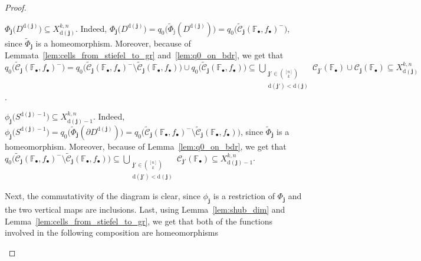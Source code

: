 \begin{proof}
\begin{i_enum}
\item $\Phi_{\mathbf{j}}\big(D^{\mathrm{d}(\mathbf{j})}\big)\subseteq X_{\mathrm{d}(\mathbf{j})}^{k,n}$. Indeed, $\Phi_{\mathbf{j}}\big(D^{\mathrm{d}(\mathbf{j})}\big)=q_0\big(\tilde{\Phi}_{\mathrm{j}}(D^{\mathrm{d}(\mathbf{j})})\big)=q_0\big(\tilde{\mathcal{C}}_{\mathbf{j}}(\mathbb{F}_{\bullet},f_{\bullet})^-\big)$, since $\tilde{\Phi}_{\mathbf{j}}$ is a homeomorphism. Moreover, because of Lemmata~\ref{lem:cells_from_stiefel_to_gr} and~\ref{lem:q0_on_bdr}, we get that $q_0\big(\tilde{\mathcal{C}}_{\mathbf{j}}(\mathbb{F}_{\bullet},f_{\bullet})^-\big)=q_0\big(\tilde{\mathcal{C}}_{\mathbf{j}}(\mathbb{F}_{\bullet},f_{\bullet})^-\setminus\tilde{\mathcal{C}}_{\mathbf{j}}(\mathbb{F}_{\bullet},f_{\bullet})\big)\cup q_0\big(\tilde{\mathcal{C}}_{\mathbf{j}}(\mathbb{F}_{\bullet},f_{\bullet})\big)\subseteq\bigcup_{\substack{\mathbf{j}'\in\binom{[n]}{k}\\\mathrm{d}(\mathbf{j}')<\mathrm{d}(\mathbf{j})}}\mathcal{C}_{\mathbf{j}'}(\mathbb{F}_{\bullet})\cup\mathcal{C}_{\mathbf{j}}(\mathbb{F}_{\bullet})\subseteq X_{\mathrm{d}(\mathbf{j})}^{k,n}$.
\item $\phi_{\mathbf{j}}\big(S^{\mathrm{d}(\mathbf{j})-1}\big)\subseteq X_{\mathrm{d}(\mathbf{j})-1}^{k,n}$. Indeed, $\phi_{\mathbf{j}}\big(S^{\mathrm{d}(\mathbf{j})-1}\big)=q_0\big(\tilde{\Phi}_{\mathbf{j}}(\partial D^{\mathrm{d}(\mathbf{j})})\big)=q_0\big(\tilde{\mathcal{C}}_{\mathbf{j}}(\mathbb{F}_{\bullet},f_{\bullet})^-\setminus\tilde{\mathcal{C}}_{\mathbf{j}}(\mathbb{F}_{\bullet},f_{\bullet})\big)$, since $\tilde{\Phi}_{\mathbf{j}}$ is a homeomorphism. Moreover, because of Lemma~\ref{lem:q0_on_bdr}, we get that $q_0\big(\tilde{\mathcal{C}}_{\mathbf{j}}(\mathbb{F}_{\bullet},f_{\bullet})^-\setminus\tilde{\mathcal{C}}_{\mathbf{j}}(\mathbb{F}_{\bullet},f_{\bullet})\big)\subseteq\bigcup_{\substack{\mathbf{j}'\in\binom{[n]}{k}\\\mathrm{d}(\mathbf{j}')<\mathrm{d}(\mathbf{j})}}\mathcal{C}_{\mathbf{j}'}(\mathbb{F}_{\bullet})\subseteq X_{\mathrm{d}(\mathbf{j})-1}^{k,n}$.
\end{i_enum}
Next, the commutativity of the diagram is clear, since $\phi_{\mathbf{j}}$ is a restriction of $\Phi_{\mathbf{j}}$ and the two vertical maps are inclusions.
Last, using Lemma~\ref{lem:shub_dim} and Lemma~\ref{lem:cells_from_stiefel_to_gr}, we get that both of the functions involved in the following composition are homeomorphisms
\begin{center}
\end{center}
\end{proof}
